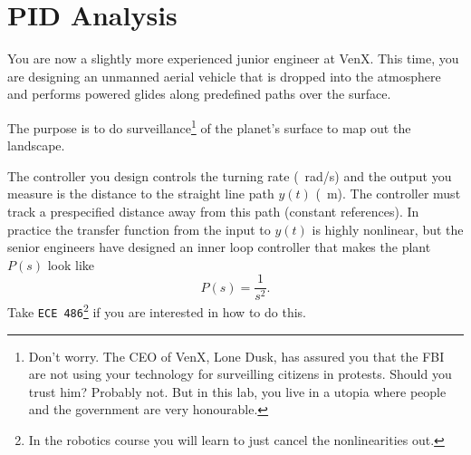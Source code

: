 \chapter{PID Analysis}\label{Lab:4}
You are now a slightly more experienced junior engineer at VenX.
This time, you are designing an unmanned aerial vehicle that is dropped into the atmosphere and performs powered glides along predefined paths over the surface.
%
\begin{center}
  
\end{center}
%
The purpose is to do surveillance\footnote{Don't worry. The CEO of VenX, Lone Dusk, has assured you that the FBI are not using your technology for surveilling citizens in protests. Should you trust him? Probably not. But in this lab, you live in a utopia where people and the government are very honourable.} of the planet's surface to map out the landscape.

The controller you design controls the turning rate (\SI{}{rad/s}) and the output you measure is the distance to the straight line path \(y(t)\) (\SI{}{m}).
The controller must track a prespecified distance away from this path (constant references).
In practice the transfer function from the input to \(y(t)\) is highly nonlinear, but the senior engineers have designed an inner loop controller that makes the plant \(P(s)\) look like
\[
  P(s) = \frac{1}{s^2}.
\]
Take \texttt{ECE 486}\footnote{In the robotics course you will learn to just cancel the nonlinearities out.} if you are interested in how to do this.

